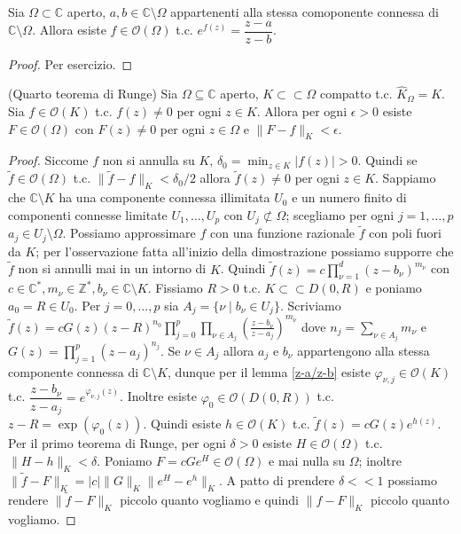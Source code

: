 \begin{lm} \label{z-a/z-b}
  Sia $\Omega \subset \mathbb{C}$ aperto, $a, b \in \mathbb{C}\setminus\Omega$ appartenenti alla stessa comoponente connessa di $\mathbb{C}\setminus\Omega$. Allora esiste $f \in \mathcal{O}(\Omega)$ t.c. $e^{f(z)}=\dfrac{z-a}{z-b}$.
\end{lm}

\begin{proof}
  Per esercizio.
\end{proof}

\begin{thm}
  (Quarto teorema di Runge) Sia $\Omega \subseteq \mathbb{C}$ aperto, $K\subset\subset\Omega$ compatto t.c. $\widehat{K}_{\Omega}=K$. Sia $f \in \mathcal{O}(K)$ t.c. $f(z) \not=0$ per ogni $z \in K$. Allora per ogni $\epsilon>0$ esiste $F \in \mathcal{O}(\Omega)$ con $F(z) \not=0$ per ogni $z \in \Omega$ e $\|F-f\|_K<\epsilon$.
\end{thm}

\begin{proof}
  Siccome $f$ non si annulla su $K$, $\displaystyle \delta_0=\min_{z \in K} |f(z)|>0$. Quindi se $\tilde{f} \in \mathcal{O}(\Omega)$ t.c. $\|\tilde{f}-f\|_K<\delta_0/2$ allora $\tilde{f}(z)\not=0$ per ogni $z \in K$.
  Sappiamo che $\mathbb{C}\setminus K$ ha una componente connessa illimitata $U_0$ e un numero finito di componenti connesse limitate $U_1, \dots, U_p$ con $U_j \not\subset \Omega$; scegliamo per ogni $j=1, \dots, p$ $a_j \in U_j \setminus \Omega$. Possiamo approssimare $f$ con una funzione razionale $\tilde{f}$ con poli fuori da $K$; per l'osservazione fatta all'inizio della dimostrazione possiamo supporre che $\tilde{f}$ non si annulli mai in un intorno di $K$.
  Quindi $\displaystyle \tilde{f}(z)=c\prod_{\nu=1}^d (z-b_{\nu})^{m_{\nu}}$ con $c \in \mathbb{C}^*, m_{\nu} \in \mathbb{Z}^*, b_{\nu} \in \mathbb{C}\setminus K$. Fissiamo $R>0$ t.c. $K \subset\subset D(0,R)$ e poniamo $a_0=R \in U_0$.
  Per $j=0, \dots, p$ sia $A_j=\{\nu \mid b_{\nu} \in U_j\}$.
  Scriviamo $\displaystyle \tilde{f}(z)=cG(z)(z-R)^{n_0} \prod_{j=0}^p \prod_{\nu \in A_j} \left(\frac{z-b_{\nu}}{z-a_j}\right)^{m_{\nu}}$ dove $\displaystyle n_{j}=\sum_{\nu \in A_j} m_{\nu}$ e $\displaystyle G(z)=\prod_{j=1}^p (z-a_j)^{n_j}$.
  Se $\nu \in A_j$ allora $a_j$ e $b_{\nu}$ appartengono alla stessa componente connessa di $\mathbb{C} \setminus K$, dunque per il lemma \ref{z-a/z-b} esiste $\varphi_{\nu, j} \in \mathcal{O}(K)$ t.c. $\dfrac{z-b_{\nu}}{z-a_j}=e^{\varphi_{\nu, j}(z)}$.
  Inoltre esiste $\varphi_0 \in \mathcal{O}(D(0, R))$ t.c. $z-R=\exp(\varphi_0(z))$. Quindi esiste $h \in \mathcal{O}(K)$ t.c. $\tilde{f}(z)=cG(z)e^{h(z)}$. Per il primo teorema di Runge, per ogni $\delta>0$ esiste $H \in \mathcal{O}(\Omega)$ t.c. $\|H-h\|_K<\delta$.
  Poniamo $F=cGe^H \in \mathcal{O}(\Omega)$ e mai nulla su $\Omega$; inoltre $\|\tilde{f}-F\|_K=|c|\|G\|_K\|e^H-e^h\|_K$. A patto di prendere $\delta<<1$ possiamo rendere $\|\tilde{f}-F\|_K$ piccolo quanto vogliamo e quindi $\|f-F\|_K$ piccolo quanto vogliamo.
\end{proof}


